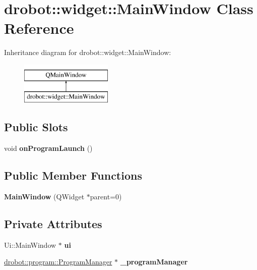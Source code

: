 \hypertarget{classdrobot_1_1widget_1_1MainWindow}{\section{drobot\-:\-:widget\-:\-:Main\-Window Class Reference}
\label{classdrobot_1_1widget_1_1MainWindow}
}
Inheritance diagram for drobot\-:\-:widget\-:\-:Main\-Window\-:\begin{figure}[H]
\begin{center}
\leavevmode
\includegraphics[height=2.000000cm]{classdrobot_1_1widget_1_1MainWindow}
\end{center}
\end{figure}
\subsection*{Public Slots}
\begin{DoxyCompactItemize}
\item 
\hypertarget{classdrobot_1_1widget_1_1MainWindow_a92780b8f96de5ace56e84ee1e3ef70a2}{void {\bfseries on\-Program\-Launch} ()}\label{classdrobot_1_1widget_1_1MainWindow_a92780b8f96de5ace56e84ee1e3ef70a2}

\end{DoxyCompactItemize}
\subsection*{Public Member Functions}
\begin{DoxyCompactItemize}
\item 
\hypertarget{classdrobot_1_1widget_1_1MainWindow_a3bc62fbbc0ba5600e8c757fde568a2cb}{{\bfseries Main\-Window} (Q\-Widget $\ast$parent=0)}\label{classdrobot_1_1widget_1_1MainWindow_a3bc62fbbc0ba5600e8c757fde568a2cb}

\end{DoxyCompactItemize}
\subsection*{Private Attributes}
\begin{DoxyCompactItemize}
\item 
\hypertarget{classdrobot_1_1widget_1_1MainWindow_ac4f80ce65cb4cb0f464b13fe9757503a}{Ui\-::\-Main\-Window $\ast$ {\bfseries ui}}\label{classdrobot_1_1widget_1_1MainWindow_ac4f80ce65cb4cb0f464b13fe9757503a}

\item 
\hypertarget{classdrobot_1_1widget_1_1MainWindow_a98317c5c39848f3dea6696d3c6f29de3}{\hyperlink{classdrobot_1_1program_1_1ProgramManager}{drobot\-::program\-::\-Program\-Manager} $\ast$ {\bfseries \-\_\-program\-Manager}}\label{classdrobot_1_1widget_1_1MainWindow_a98317c5c39848f3dea6696d3c6f29de3}

\end{DoxyCompactItemize}


